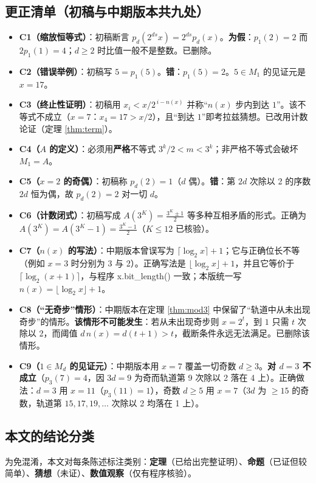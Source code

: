 \documentclass[11pt]{article}
\theoremstyle{definition}\newtheorem{definition}[theorem]{定义}
\theoremstyle{definition}\newtheorem{conjecture}[theorem]{猜想}
\theoremstyle{remark}\newtheorem{remark}[theorem]{注}
\begin{document}
\subsection{更正清单（初稿与中期版本共九处）}
\begin{itemize}\item \textbf{C1（缩放恒等式）}：初稿断言 $p_d(2^{ds}x)=2^{ds}p_d(x)$。\textbf{为假}：$p_1(2)=2$ 而 $2p_1(1)=4$；$d\ge2$ 时比值一般不是整数。已删除。\item \textbf{C2（错误举例）}：初稿写 $5=p_1(5)$。\textbf{错}：$p_1(5)=2$。$5\in M_1$ 的见证元是 $x=17$。\item \textbf{C3（终止性证明）}：初稿用 $x_i<x/2^{\,i-n(x)}$ 并称“$n(x)$ 步内到达 $1$”。该不等式不成立（$x=7$：$x_4=17>x/2$），且“到达 $1$”即考拉兹猜想。已改用计数论证（定理 \ref{thm:term}）。\item \textbf{C4（$A$ 的定义）}：必须用\textbf{严格}不等式 $3^k/2<m<3^k$；非严格不等式会破坏 $M_1=A$。\item \textbf{C5（$x=2$ 的奇偶）}：初稿称 $p_d(2)=1$（$d$ 偶）。\textbf{错}：第 $2d$ 次除以 2 的序数 $2d$ 恒为偶，故 $p_d(2)=2$ 对一切 $d$。\item \textbf{C6（计数闭式）}：初稿写成 $A(3^K)=\frac{3^K\pm1}{2}$ 等多种互相矛盾的形式。正确为 $A(3^K)=A(3^K-1)=\frac{3^K-1}{2}$（$K\le12$ 已核验）。\item \textbf{C7（$n(x)$ 的写法）}：中期版本曾误写为 $\lceil\log_2x\rceil+1$；它与正确位长不等（例如 $x=3$ 时分别为 3 与 2）。正确写法是 $\lfloor\log_2x\rfloor+1$，并且它等价于 $\lceil\log_2(x+1)\rceil$，与程序 x.bit\_length() 一致；本版统一写 $n(x)=\lfloor\log_2x\rfloor+1$。\item \textbf{C8（“无奇步”情形）}：中期版本在定理 \ref{thm:mod3} 中保留了“轨道中从未出现奇步”的情形。\textbf{该情形不可能发生}：若从未出现奇步则 $x=2^{t}$，到 $1$ 只需 $t$ 次除以 2，而阈值 $d\,n(x)=d(t+1)>t$，截断条件永远无法满足。已删除该情形。\item \textbf{C9（$1\in M_d$ 的见证元）}：中期版本用 $x=7$ 覆盖一切奇数 $d\ge3$。\textbf{对 $d=3$ 不成立}（$p_3(7)=4$，因 $3d=9$ 为奇而轨道第 9 次除以 2 落在 4 上）。正确做法：$d=3$ 用 $x=11$（$p_3(11)=1$），奇数 $d\ge5$ 用 $x=7$（$3d$ 为 $\ge15$ 的奇数，轨道第 $15,17,19,\dots$ 次除以 2 均落在 1 上）。\end{itemize}
\subsection{本文的结论分类}
为免混淆，本文对每条陈述标注类别：\textbf{定理}（已给出完整证明）、\textbf{命题}（已证但较简单）、\textbf{猜想}（未证）、\textbf{数值观察}（仅有程序核验）。
\end{document}
